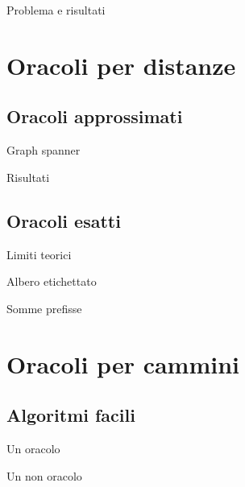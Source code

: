 \documentclass{beamer}
\theoremstyle{plain}
\theoremstyle{definition}
\theoremstyle{remark}
\begin{document}
\begin{frame}
  Problema e risultati
\end{frame}


\section{Oracoli per distanze}

\subsection{Oracoli approssimati}

\begin{frame}{Graph spanner}
  
\end{frame}

\begin{frame}{Risultati}
  
\end{frame}

\subsection{Oracoli esatti}

\begin{frame}{Limiti teorici}
  
\end{frame}

\begin{frame}{Albero etichettato}
  
\end{frame}

\begin{frame}{Somme prefisse}
  
\end{frame}


\section{Oracoli per cammini}

\subsection{Algoritmi facili}

\begin{frame}{Un oracolo}
  
\end{frame}

\begin{frame}{Un non oracolo}
  
\end{frame}
\end{document}
